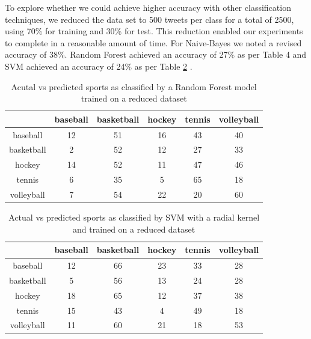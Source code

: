 \documentclass[journal, a4paper]{IEEEtran}
\begin{document}
To explore whether we could achieve higher accuracy with other classification techniques, we reduced the data set to 500 tweets per class for a total of 2500, using 70\% for training and 30\% for test. This reduction enabled our experiments to complete in a reasonable amount of time. For Naive-Bayes we noted a revised accuracy of 38\%. Random Forest achieved an accuracy of 27\% as per Table 4 and SVM achieved an accuracy of 24\% as per Table \ref{Tab:5} .
\begin{table}[ht]
	\begin{center}
		\begin{tabular}{|c|c c c c c|}
			\hline
			\diagbox[width=8em]{actual}{predicted}& baseball & basketball & hockey & tennis& volleyball\\
			\hline
			baseball & 12&51&16&43&40\\
			basketball &2&52&12&27&33\\
			hockey & 14&52&11&47&46\\
			tennis &6&35&5&65&18\\
			volleyball& 7&54&22&20&60\\
			\hline
		\end{tabular}
	\end{center}
	\caption{Acutal vs predicted sports as classified by a Random Forest model trained on a reduced dataset}\label{Tab:4}
\end{table}
\begin{table}[ht]
	\begin{center}
		\begin{tabular}{|c|c c c c c|}
			\hline
			\diagbox[width=8em]{actual}{predicted}& baseball & basketball & hockey & tennis& volleyball\\
			\hline
			baseball &12&66&23&33&28\\
			basketball &5&56&13&24&28\\
			hockey &18&65 &12&37&38\\
			tennis &15&43&4&49&18\\
			volleyball&11&60&21&18&53\\
			\hline
		\end{tabular}
	\end{center}
	\caption{Actual vs predicted sports as classified by SVM with a radial kernel and trained on a reduced dataset}\label{Tab:5}
\end{table}
\end{document}
